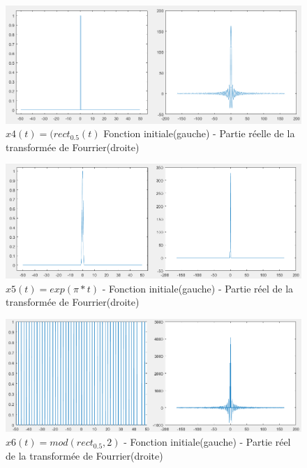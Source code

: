 \documentclass[10pt,a4paper]{article}
\begin{document}
\begin{figure}[h]
\begin{center}
\includegraphics[scale=0.7]{x4.png}
\caption{$x4(t) = (rect_{0.5}(t)$ Fonction initiale(gauche) - Partie réelle de la transformée de Fourrier(droite)}
\end{center}
\end{figure}


\begin{figure}[!h]
\begin{center}
\includegraphics[scale=0.7]{x5.png}
\caption{$x5(t) = exp(\pi*t)$ - Fonction initiale(gauche) - Partie réel de la transformée de Fourrier(droite)}
\end{center}
\end{figure}

\begin{figure}[H]
\begin{center}
\includegraphics[scale=0.7]{x6.png}
\caption{$x6(t) = mod(rect_{0.5},2)$ - Fonction initiale(gauche) - Partie réel de la transformée de Fourrier(droite)}
\end{center}
\end{figure}
\end{document}
